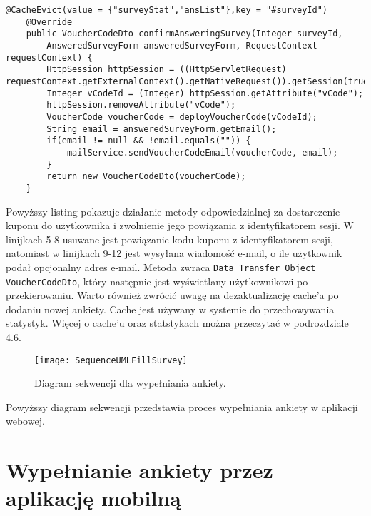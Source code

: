 \begin{center}
\begin{lstlisting}[caption={Listing kodu blokującego kod promocyjny.},captionpos=b]
	@CacheEvict(value = {"surveyStat","ansList"},key = "#surveyId")
    @Override
    public VoucherCodeDto confirmAnsweringSurvey(Integer surveyId, 
    	AnsweredSurveyForm answeredSurveyForm, RequestContext requestContext) {
        HttpSession httpSession = ((HttpServletRequest) requestContext.getExternalContext().getNativeRequest()).getSession(true);
        Integer vCodeId = (Integer) httpSession.getAttribute("vCode");
        httpSession.removeAttribute("vCode");
        VoucherCode voucherCode = deployVoucherCode(vCodeId);
        String email = answeredSurveyForm.getEmail();
        if(email != null && !email.equals("")) {
            mailService.sendVoucherCodeEmail(voucherCode, email);
        }
        return new VoucherCodeDto(voucherCode);
    }
\end{lstlisting}
\end{center}

Powyższy listing pokazuje działanie metody odpowiedzialnej za dostarczenie kuponu do użytkownika i zwolnienie jego powiązania z identyfikatorem sesji. W linijkach 5-8 usuwane jest powiązanie kodu kuponu z identyfikatorem sesji, natomiast w linijkach 9-12 jest wysyłana wiadomość e-mail, o ile użytkownik podał opcjonalny adres e-mail. Metoda zwraca \texttt{Data Transfer Object} \texttt{VoucherCodeDto}, który następnie jest wyświetlany użytkownikowi po przekierowaniu. Warto również zwrócić uwagę na dezaktualizację cache'a po dodaniu nowej ankiety. Cache jest używany w systemie do przechowywania statystyk. Więcej o cache'u oraz statstykach można przeczytać w podrozdziale 4.6.

\begin{figure}[h]
\centering
\texttt{[image: SequenceUMLFillSurvey]}
\caption{Diagram sekwencji dla wypełniania ankiety.}
\end{figure}

Powyższy diagram sekwencji przedstawia proces wypełniania ankiety w aplikacji webowej. 

\section{Wypełnianie ankiety przez aplikację mobilną}
